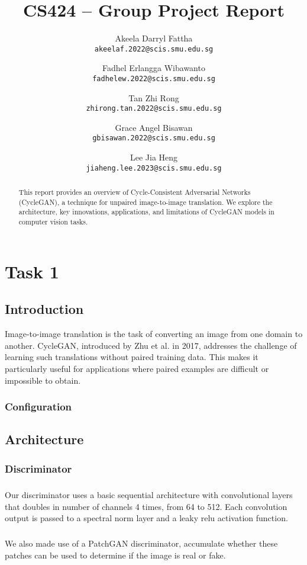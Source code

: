 \documentclass[twoside,english,notitlepage]{report}
\title{CS424 – Group Project Report}
\author{
    Akeela Darryl Fattha\\
    \texttt{akeelaf.2022@scis.smu.edu.sg}
    \and
    Fadhel Erlangga Wibawanto\\
    \texttt{fadhelew.2022@scis.smu.edu.sg}
    \and
    Tan Zhi Rong\\
    \texttt{zhirong.tan.2022@scis.smu.edu.sg}
    \and
    Grace Angel Bisawan \\
    \texttt{gbisawan.2022@scis.smu.edu.sg}
    \and
    Lee Jia Heng\\
    \texttt{jiaheng.lee.2023@scis.smu.edu.sg}
}
\begin{document}
\date{}
\maketitle
\begin{abstract}
This report provides an overview of Cycle-Consistent Adversarial Networks (CycleGAN), a technique for unpaired image-to-image translation. We explore the architecture, key innovations, applications, and limitations of CycleGAN models in computer vision tasks.
\end{abstract}
\tableofcontents


\chapter{Task 1}

\section{Introduction}
Image-to-image translation is the task of converting an image from one domain to another. CycleGAN, introduced by Zhu et al. in 2017, addresses the challenge of learning such translations without paired training data. This makes it particularly useful for applications where paired examples are difficult or impossible to obtain.

\subsection{Configuration}





\section{Architecture}
\subsection{Discriminator}
\paragraph{} Our discriminator uses a basic sequential architecture with convolutional layers that doubles in number of channels 4 times, from 64 to 512. Each convolution output is passed to a spectral norm layer and a leaky relu activation function. 

\paragraph{} We also made use of a PatchGAN discriminator, accumulate whether these patches can be used to determine if the image is real or fake.
\end{document}
